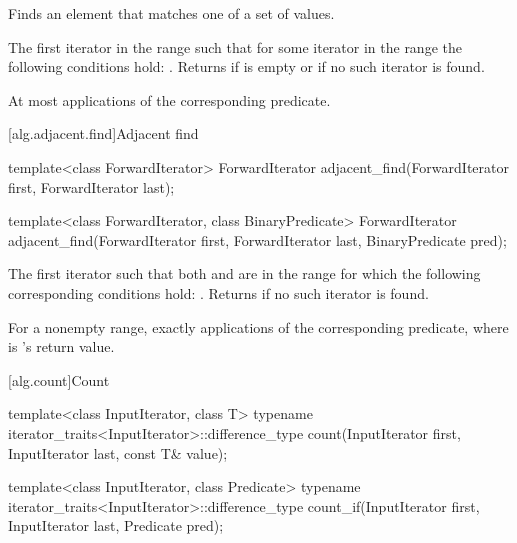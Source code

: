 \begin{itemdescr}
\pnum
\effects
Finds an element that matches one of a set of values.

\pnum
\returns
The first iterator
in the range 
such that for some
iterator
in the range 
the following conditions hold:
.
Returns 
if  is empty or
if no such iterator is found.

\pnum
\complexity
At most
applications of the corresponding predicate.
\end{itemdescr}

[alg.adjacent.find]{Adjacent find}

%
\begin{itemdecl}
template<class ForwardIterator>
  ForwardIterator adjacent_find(ForwardIterator first, ForwardIterator last);

template<class ForwardIterator, class BinaryPredicate>
  ForwardIterator adjacent_find(ForwardIterator first, ForwardIterator last,
                              BinaryPredicate pred);
\end{itemdecl}

\begin{itemdescr}
\pnum
\returns
The first iterator
such that both
and
are in
the range
for which
the following corresponding conditions hold:
.
Returns 
if no such iterator is found.

\pnum
\complexity
For a nonempty range, exactly
applications of the corresponding predicate, where  is
's
return value.
\end{itemdescr}

[alg.count]{Count}

%
%
\begin{itemdecl}
template<class InputIterator, class T>
    typename iterator_traits<InputIterator>::difference_type
       count(InputIterator first, InputIterator last, const T& value);

template<class InputIterator, class Predicate>
    typename iterator_traits<InputIterator>::difference_type
      count_if(InputIterator first, InputIterator last, Predicate pred);
\end{itemdecl}

